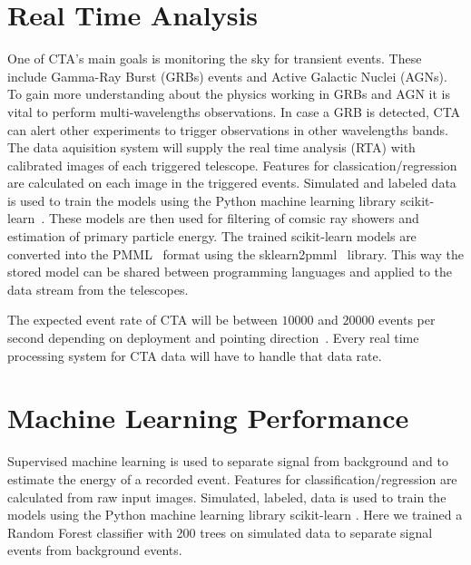 \documentclass[11pt,twoside]{article}
\begin{document}
\section{Real Time Analysis}

One of CTA's main goals is monitoring the sky for transient events.
These include Gamma-Ray Burst (GRBs) events and Active Galactic Nuclei (AGNs).
To gain more understanding about the physics working in GRBs and AGN it is vital to perform multi-wavelengths observations.
In case a GRB is detected,  CTA can alert other experiments to trigger observations in other wavelengths bands.
The data aquisition system will supply the real time analysis (RTA) with calibrated images of each triggered telescope.
Features for classication/regression are calculated on each image in the triggered events.
Simulated and labeled data is used to train the models using the Python machine learning library scikit-learn~\citep{sklearn}.
These models are then used for filtering of comsic ray showers and estimation of primary particle energy.
The trained scikit-learn models are converted into the PMML~\citep{pmml} format using the sklearn2pmml~\citep{sklearn2pmml} library.
This way the stored model can be shared between programming languages and applied to the data stream from the telescopes.

The expected event rate of CTA will be between $10000$ and $20000$ events per second depending on deployment
and pointing direction~\citep{trigger}. Every real time processing system for CTA data will have to handle that data rate.



\section{Machine Learning Performance}

Supervised machine learning is used to separate signal from background and to estimate the energy of a recorded event.
Features for classification/regression are calculated from raw input images.
Simulated, labeled, data is used to train the models using the Python machine learning library scikit-learn \citep{sklearn}.
Here we trained a Random Forest classifier with 200 trees on simulated data to separate signal events from background events.
\end{document}
